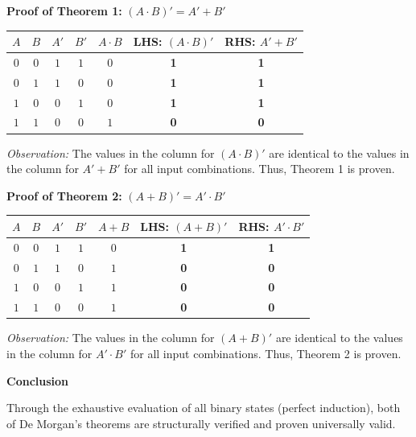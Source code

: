 \documentclass[12pt,a3paper]{article}
\begin{document}
\begin{enumerate}
\begin{tcolorbox}[enhanced,breakable,ansbox,colback=cA!4,colframe=cA,boxrule=0.8pt,arc=5pt,title={\textbf{Answer}},fonttitle=\bfseries\color{white},colbacktitle=cA]
\vspace{0.3cm}
\textbf{Proof of Theorem 1:} $(A \cdot B)' = A' + B'$

\begin{center}
\renewcommand{\arraystretch}{1.3}
\begin{tabular}{|c|c||c|c||c|c||c|}
\hline
\textbf{$A$} & \textbf{$B$} & \textbf{$A'$} & \textbf{$B'$} & \textbf{$A \cdot B$} & \textbf{LHS: $(A \cdot B)'$} & \textbf{RHS: $A' + B'$} \\
\hline
$0$ & $0$ & $1$ & $1$ & $0$ & \textbf{1} & \textbf{1} \\
\hline
$0$ & $1$ & $1$ & $0$ & $0$ & \textbf{1} & \textbf{1} \\
\hline
$1$ & $0$ & $0$ & $1$ & $0$ & \textbf{1} & \textbf{1} \\
\hline
$1$ & $1$ & $0$ & $0$ & $1$ & \textbf{0} & \textbf{0} \\
\hline
\end{tabular}
\end{center}

\textit{Observation:} The values in the column for \textbf{$(A \cdot B)'$} are identical to the values in the column for \textbf{$A' + B'$} for all input combinations. Thus, Theorem 1 is proven.

\vspace{0.6cm}
\textbf{Proof of Theorem 2:} $(A + B)' = A' \cdot B'$

\begin{center}
\renewcommand{\arraystretch}{1.3}
\begin{tabular}{|c|c||c|c||c|c||c|}
\hline
\textbf{$A$} & \textbf{$B$} & \textbf{$A'$} & \textbf{$B'$} & \textbf{$A + B$} & \textbf{LHS: $(A + B)'$} & \textbf{RHS: $A' \cdot B'$} \\
\hline
$0$ & $0$ & $1$ & $1$ & $0$ & \textbf{1} & \textbf{1} \\
\hline
$0$ & $1$ & $1$ & $0$ & $1$ & \textbf{0} & \textbf{0} \\
\hline
$1$ & $0$ & $0$ & $1$ & $1$ & \textbf{0} & \textbf{0} \\
\hline
$1$ & $1$ & $0$ & $0$ & $1$ & \textbf{0} & \textbf{0} \\
\hline
\end{tabular}
\end{center}

\textit{Observation:} The values in the column for \textbf{$(A + B)'$} are identical to the values in the column for \textbf{$A' \cdot B'$} for all input combinations. Thus, Theorem 2 is proven.

\vspace{0.4cm}
\textbf{Conclusion}

Through the exhaustive evaluation of all binary states (perfect induction), both of De Morgan's theorems are structurally verified and proven universally valid.

\end{tcolorbox}

\end{enumerate}
\end{document}
